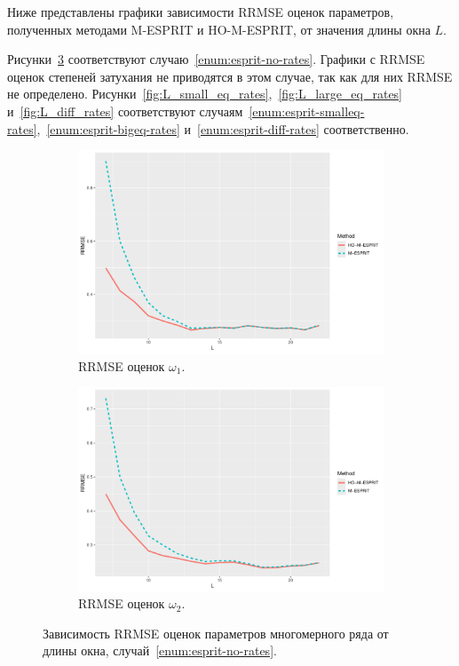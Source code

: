 \documentclass[specialist,
  substylefile=spbu_report.rtx,
subf,href,colorlinks=true, 12pt]{disser}
\theoremstyle{plain}
\theoremstyle{definition}
\theoremstyle{remark}
\begin{document}
Ниже представлены графики зависимости RRMSE оценок параметров,
полученных методами M-ESPRIT и HO-M-ESPRIT, от значения длины окна $L$.

Рисунки~\ref{fig:L_no_rates} соответствуют случаю~\ref{enum:esprit-no-rates}.
Графики с RRMSE оценок степеней затухания не приводятся в этом
случае, так как для них RRMSE не определено.
Рисунки~\ref{fig:L_small_eq_rates},~\ref{fig:L_large_eq_rates}
и~\ref{fig:L_diff_rates}
соответствуют
случаям~\ref{enum:esprit-smalleq-rates},~\ref{enum:esprit-bigeq-rates}
и~\ref{enum:esprit-diff-rates}
соответственно.
\begin{figure}[!ht]
  \centering
  \begin{subfigure}{0.49\linewidth}
    \includegraphics[width=\linewidth]{freq1_L_no_rates.pdf}
    \caption{RRMSE оценок $\omega_1$.}
    \label{fig:freq1_L_no_rates}
  \end{subfigure}
  \begin{subfigure}{0.49\linewidth}
    \includegraphics[width=\linewidth]{freq2_L_no_rates.pdf}
    \caption{RRMSE оценок $\omega_2$.}
    \label{fig:freq2_L_no_rates}
  \end{subfigure}
  \caption{Зависимость RRMSE оценок параметров многомерного ряда от
    длины окна,
  случай~\ref{enum:esprit-no-rates}.}
  \label{fig:L_no_rates}
\end{figure}
\end{document}
